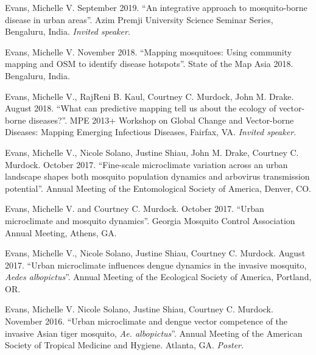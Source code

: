 
\begin{cvitems}
	\bigskip
	\item Evans, Michelle V. September 2019. ``An integrative approach to mosquito-borne disease in urban areas''. Azim Premji University Science Seminar Series, Bengaluru, India. \textit{Invited speaker.}

	\item Evans, Michelle V. November 2018. ``Mapping mosquitoes: Using community mapping and OSM to identify disease hotspots''. State of the Map Asia 2018. Bengaluru, India.

	\item Evans, Michelle V., RajReni B. Kaul, Courtney C. Murdock, John M. Drake. August 2018. ``What can predictive mapping tell us about the ecology of vector-borne diseases?''. MPE 2013+ Workshop on Global Change and Vector-borne Diseases: Mapping Emerging Infectious Diseases, Fairfax, VA. \textit{Invited speaker.}

	\item Evans, Michelle V., Nicole Solano, Justine Shiau, John M. Drake, Courtney C. Murdock. October 2017. ``Fine-scale microclimate variation across an urban landscape shapes both mosquito population dynamics and arbovirus transmission potential''. Annual Meeting of the Entomological Society of America, Denver, CO.

	\item Evans, Michelle V. and Courtney C. Murdock. October 2017. ``Urban microclimate and mosquito dynamics''. Georgia Mosquito Control Association Annual Meeting, Athens, GA.

	\item Evans, Michelle V., Nicole Solano, Justine Shiau, Courtney C. Murdock. August 2017. ``Urban microclimate influences dengue dynamics in the invasive mosquito, \textit{Aedes albopictus}''. Annual Meeting of the Ecological Society of America, Portland, OR.

	\item Evans, Michelle V. Nicole Solano, Justine Shiau, Courtney C. Murdock. November 2016. ``Urban microclimate and dengue vector competence of the invasive Asian tiger mosquito, \textit{Ae. albopictus}''. Annual Meeting of the American Society of Tropical Medicine and Hygiene. Atlanta, GA. \textit{Poster.}


\end{cvitems}
